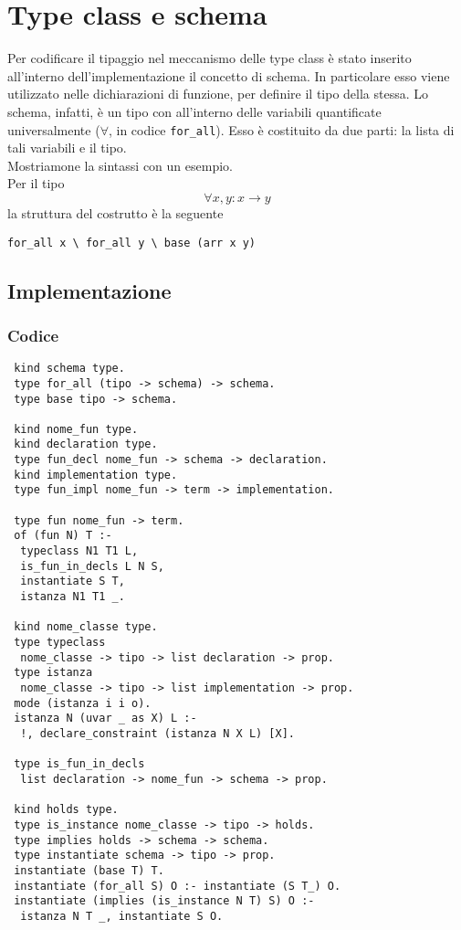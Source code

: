 \documentclass[12pt,a4paper,openright,twoside]{report}
\begin{document}
\section{Type class e schema}
Per codificare il tipaggio nel meccanismo delle type class è stato inserito all'interno dell'implementazione il concetto di schema. In particolare esso viene utilizzato nelle dichiarazioni di funzione, per definire il tipo della stessa. Lo schema, infatti, è un tipo con all'interno delle variabili quantificate universalmente ($\forall$, in codice \verb"for_all"). Esso è costituito da due parti: la lista di tali variabili e il tipo.\\
Mostriamone la sintassi con un esempio.\\
Per il tipo
\begin{equation}
 \forall x,y : x \rightarrow y \label{eq:fax->y}
\end{equation}
la struttura del costrutto è la seguente
\begin{center}
 \verb"for_all x \ for_all y \ base (arr x y)"
\end{center}

\subsection{Implementazione}\label{implTypCl}

\subsubsection{Codice}
\begin{verbatim}
 kind schema type.
 type for_all (tipo -> schema) -> schema.
 type base tipo -> schema.
 
 kind nome_fun type.
 kind declaration type.
 type fun_decl nome_fun -> schema -> declaration.
 kind implementation type.
 type fun_impl nome_fun -> term -> implementation.
 
 type fun nome_fun -> term.
 of (fun N) T :-
  typeclass N1 T1 L,
  is_fun_in_decls L N S,
  instantiate S T,
  istanza N1 T1 _.
 
 kind nome_classe type.
 type typeclass
  nome_classe -> tipo -> list declaration -> prop.
 type istanza
  nome_classe -> tipo -> list implementation -> prop.
 mode (istanza i i o).
 istanza N (uvar _ as X) L :-
  !, declare_constraint (istanza N X L) [X].
 
 type is_fun_in_decls
  list declaration -> nome_fun -> schema -> prop.
 
 kind holds type.
 type is_instance nome_classe -> tipo -> holds.
 type implies holds -> schema -> schema.
 type instantiate schema -> tipo -> prop.
 instantiate (base T) T.
 instantiate (for_all S) O :- instantiate (S T_) O.
 instantiate (implies (is_instance N T) S) O :-
  istanza N T _, instantiate S O.
\end{verbatim}
\end{document}
